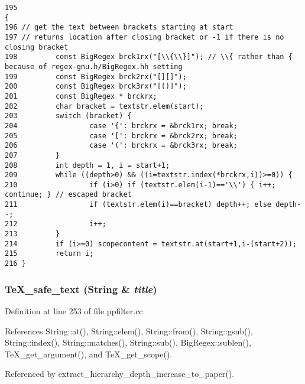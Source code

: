 \footnotesize\begin{verbatim}195                                                                       {
196 // get the text between brackets starting at start
197 // returns location after closing bracket or -1 if there is no closing bracket
198         const BigRegex brck1rx("[\\{\\}]"); // \\{ rather than { because of regex-gnu.h/BigRegex.hh setting
199         const BigRegex brck2rx("[][]");
200         const BigRegex brck3rx("[()]");
201         const BigRegex * brckrx;
202         char bracket = textstr.elem(start);
203         switch (bracket) {
204                 case '{': brckrx = &brck1rx; break;
205                 case '[': brckrx = &brck2rx; break;
206                 case '(': brckrx = &brck3rx; break;
207         }
208         int depth = 1, i = start+1;
209         while ((depth>0) && ((i=textstr.index(*brckrx,i))>=0)) {
210                 if (i>0) if (textstr.elem(i-1)=='\\') { i++; continue; } // escaped bracket
211                 if (textstr.elem(i)==bracket) depth++; else depth--;
212                 i++;
213         }
214         if (i>=0) scopecontent = textstr.at(start+1,i-(start+2));
215         return i;
216 }
\end{verbatim}\normalsize 
{}
\subsubsection{ Te\-X\_\-safe\_\-text ({\bf String} \& {\em title})}\label{ppfilter_8cc_a7}




Definition at line 253 of file ppfilter.cc.

References String::at(), String::elem(), String::from(), String::gsub(), String::index(), String::matches(), String::sub(), Big\-Regex::sublen(), Te\-X\_\-get\_\-argument(), and Te\-X\_\-get\_\-scope().

Referenced by extract\_\-hierarchy\_\-depth\_\-increase\_\-to\_\-paper().



